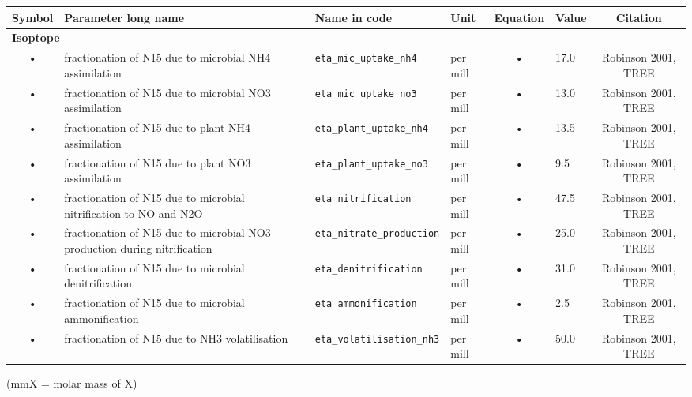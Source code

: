 \begin{table}
\begin{tabularx}{\linewidth}{|c|X|l|l|c|l|c|} %
\hline 
Symbol & Parameter long name & Name in code & Unit & Equation & Value & Citation \\ 
\hline 

\multicolumn{6}{l}{\bf Isoptope}\\
\hline
• & fractionation of N15 due to microbial NH4 assimilation & \texttt{eta\_mic\_uptake\_nh4} & per mill & • & 17.0 & Robinson 2001, TREE \\
• & fractionation of N15 due to microbial NO3 assimilation & \texttt{eta\_mic\_uptake\_no3} & per mill & • & 13.0 & Robinson 2001, TREE \\
• & fractionation of N15 due to plant NH4 assimilation & \texttt{eta\_plant\_uptake\_nh4} & per mill & • & 13.5 & Robinson 2001, TREE \\
• & fractionation of N15 due to plant NO3 assimilation & \texttt{eta\_plant\_uptake\_no3} & per mill & • & 9.5 & Robinson 2001, TREE \\
• & fractionation of N15 due to microbial nitrification to NO and N2O & \texttt{eta\_nitrification} & per mill & • & 47.5 & Robinson 2001, TREE \\
• & fractionation of N15 due to microbial NO3 production during nitrification & \texttt{eta\_nitrate\_production} & per mill & • & 25.0 & Robinson 2001, TREE \\
• & fractionation of N15 due to microbial denitrification & \texttt{eta\_denitrification} & per mill & • & 31.0 & Robinson 2001, TREE \\
• & fractionation of N15 due to microbial ammonification & \texttt{eta\_ammonification} & per mill & • & 2.5 & Robinson 2001, TREE \\
• & fractionation of N15 due to NH3 volatilisation & \texttt{eta\_volatilisation\_nh3} & per mill & • & 50.0 & Robinson 2001, TREE \\
\hline 
\end{tabularx}
(mmX = molar mass of X)
\end{table}


